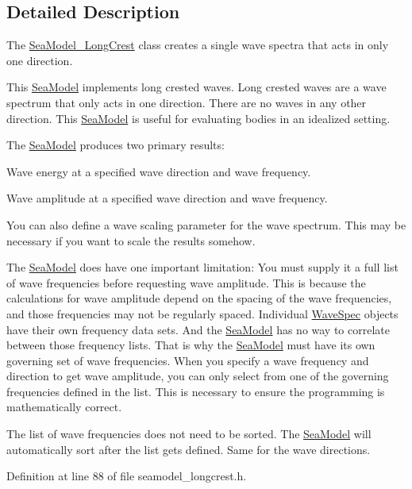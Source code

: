 \subsection{Detailed Description}
The \hyperlink{classosea_1_1_sea_model___long_crest}{Sea\-Model\-\_\-\-Long\-Crest} class creates a single wave spectra that acts in only one direction. 

This \hyperlink{classosea_1_1_sea_model}{Sea\-Model} implements long crested waves. Long crested waves are a wave spectrum that only acts in one direction. There are no waves in any other direction. This \hyperlink{classosea_1_1_sea_model}{Sea\-Model} is useful for evaluating bodies in an idealized setting.

The \hyperlink{classosea_1_1_sea_model}{Sea\-Model} produces two primary results\-:
\begin{DoxyEnumerate}
\item Wave energy at a specified wave direction and wave frequency.
\item Wave amplitude at a specified wave direction and wave frequency.
\end{DoxyEnumerate}

You can also define a wave scaling parameter for the wave spectrum. This may be necessary if you want to scale the results somehow.

The \hyperlink{classosea_1_1_sea_model}{Sea\-Model} does have one important limitation\-: You must supply it a full list of wave frequencies before requesting wave amplitude. This is because the calculations for wave amplitude depend on the spacing of the wave frequencies, and those frequencies may not be regularly spaced. Individual \hyperlink{classosea_1_1_wave_spec}{Wave\-Spec} objects have their own frequency data sets. And the \hyperlink{classosea_1_1_sea_model}{Sea\-Model} has no way to correlate between those frequency lists. That is why the \hyperlink{classosea_1_1_sea_model}{Sea\-Model} must have its own governing set of wave frequencies. When you specify a wave frequency and direction to get wave amplitude, you can only select from one of the governing frequencies defined in the list. This is necessary to ensure the programming is mathematically correct.

The list of wave frequencies does not need to be sorted. The \hyperlink{classosea_1_1_sea_model}{Sea\-Model} will automatically sort after the list gets defined. Same for the wave directions. 

Definition at line 88 of file seamodel\-\_\-longcrest.\-h.



